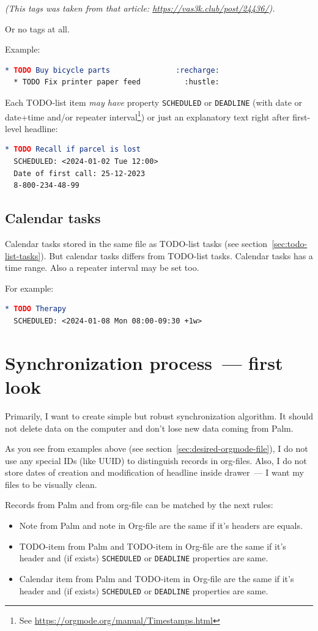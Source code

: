 \documentclass[a4paper,12pt,oneside]{scrartcl}
\begin{document}
\textit{(This tags was taken from that article:
  \url{https://vas3k.club/post/24436/}).}

Or no tags at all.

Example:
\begin{lstlisting}[language=org]
  * TODO Buy bicycle parts               :recharge:
  * TODO Fix printer paper feed          :hustle:
\end{lstlisting}

Each TODO-list item \textit{may have} property \texttt{SCHEDULED} or
\texttt{DEADLINE} (with date or date+time and/or repeater interval\footnote{See
  \url{https://orgmode.org/manual/Timestamps.html}}) or just an explanatory text
right after first-level headline:
\begin{lstlisting}[language=org]
  * TODO Recall if parcel is lost
  SCHEDULED: <2024-01-02 Tue 12:00>
  Date of first call: 25-12-2023
  8-800-234-48-99
\end{lstlisting}

\subsection{Calendar tasks}
\label{sec:calendar-tasks}

Calendar tasks stored in the same file as TODO-list tasks (see
section~\ref{sec:todo-list-tasks}). But calendar tasks differs from TODO-list
tasks. Calendar tasks has a time range. Also a repeater interval may be set too.

For example:
\begin{lstlisting}[language=org]
  * TODO Therapy
  SCHEDULED: <2024-01-08 Mon 08:00-09:30 +1w>
\end{lstlisting}

\section{Synchronization process~--- first look}
\label{sec:synchr-scen-first-look}

Primarily, I want to create simple but robust synchronization algorithm. It
should not delete data on the computer and don't lose new data coming from Palm.

As you see from examples above (see section~\ref{sec:desired-orgmode-file}), I
do not use any special IDs (like UUID) to distinguish records in
org-files. Also, I do not store dates of creation and modification of headline
inside drawer~--- I want my files to be visually clean.

Records from Palm and from org-file can be matched by the next rules:
\begin{itemize}
\item Note from Palm and note in Org-file are the same if it's headers are
  equals.
\item TODO-item from Palm and TODO-item in Org-file are the same if it's header
  and (if exists) \texttt{SCHEDULED} or \texttt{DEADLINE} properties are same.
\item Calendar item from Palm and TODO-item in Org-file are the same if it's
  header and (if exists) \texttt{SCHEDULED} or \texttt{DEADLINE} properties are
  same.
\end{itemize}
\end{document}
